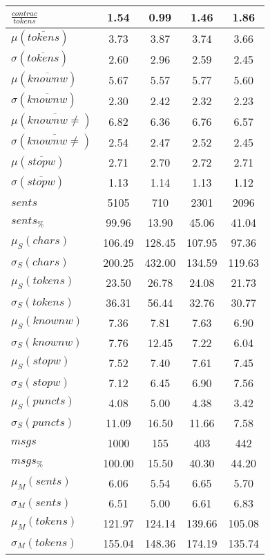 \begin{table}[h!]
\begin{center}
\begin{tabular}{| l || c | c | c | c |}
$\frac{contrac}{tokens}$ & 1.54  & 0.99  & 1.46  & 1.86 \\\hline\hline
$\mu(\overline{tokens})$ & 3.73  & 3.87  & 3.74  & 3.66 \\
$\sigma(\overline{tokens})$ & 2.60  & 2.96  & 2.59  & 2.45 \\\hline
$\mu(\overline{knownw})$ & 5.67  & 5.57  & 5.77  & 5.60 \\
$\sigma(\overline{knownw})$ & 2.30  & 2.42  & 2.32  & 2.23 \\\hline
$\mu(\overline{knownw \neq})$ & 6.82  & 6.36  & 6.76  & 6.57 \\
$\sigma(\overline{knownw \neq})$ & 2.54  & 2.47  & 2.52  & 2.45 \\\hline
$\mu(\overline{stopw})$ & 2.71  & 2.70  & 2.72  & 2.71 \\
$\sigma(\overline{stopw})$ & 1.13  & 1.14  & 1.13  & 1.12 \\\hline\hline
$sents$ & 5105  & 710  & 2301  & 2096 \\
$sents_{\%}$ & 99.96  & 13.90  & 45.06  & 41.04 \\\hline
$\mu_S(chars)$ & 106.49  & 128.45  & 107.95  & 97.36 \\
$\sigma_S(chars)$ & 200.25  & 432.00  & 134.59  & 119.63 \\\hline
$\mu_S(tokens)$ & 23.50  & 26.78  & 24.08  & 21.73 \\
$\sigma_S(tokens)$ & 36.31  & 56.44  & 32.76  & 30.77 \\\hline
$\mu_S(knownw)$ & 7.36  & 7.81  & 7.63  & 6.90 \\
$\sigma_S(knownw)$ & 7.76  & 12.45  & 7.22  & 6.04 \\\hline
$\mu_S(stopw)$ & 7.52  & 7.40  & 7.61  & 7.45 \\
$\sigma_S(stopw)$ & 7.12  & 6.45  & 6.90  & 7.56 \\\hline
$\mu_S(puncts)$ & 4.08  & 5.00  & 4.38  & 3.42 \\
$\sigma_S(puncts)$ & 11.09  & 16.50  & 11.66  & 7.58 \\\hline\hline
$msgs$ & 1000  & 155  & 403  & 442 \\
$msgs_{\%}$ & 100.00  & 15.50  & 40.30  & 44.20 \\\hline
$\mu_M(sents)$ & 6.06  & 5.54  & 6.65  & 5.70 \\
$\sigma_M(sents)$ & 6.51  & 5.00  & 6.61  & 6.83 \\\hline
$\mu_M(tokens)$ & 121.97  & 124.14  & 139.66  & 105.08 \\
$\sigma_M(tokens)$ & 155.04  & 148.36  & 174.19  & 135.74 \\\hline

\end{tabular}
\end{center}
\end{table}
